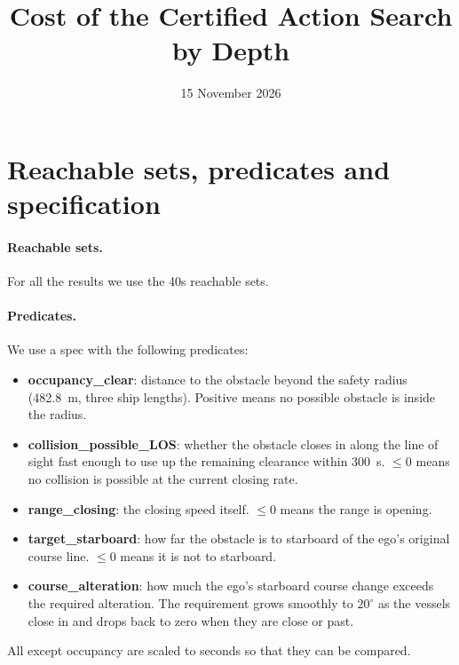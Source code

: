 \documentclass[11pt,a4paper]{article}
\title{Cost of the Certified Action Search by Depth}
\author{} %
\date{15 November 2026}
\begin{document}
\maketitle

\section{Reachable sets, predicates and specification}

\paragraph{Reachable sets.} For all the results we use the 40s reachable sets. 

\paragraph{Predicates.} We use a spec with the following predicates:
\begin{itemize}\itemsep 2pt
  \item \textbf{occupancy\_clear}: distance to the obstacle beyond the safety
    radius (482.8~m, three ship lengths). Positive means no possible obstacle
    is inside the radius.
  \item \textbf{collision\_possible\_LOS}: whether the obstacle closes in
    along the line of sight fast enough to use up the remaining clearance
    within 300~s. $\le 0$ means no collision is possible at the current
    closing rate.
  \item \textbf{range\_closing}: the closing speed itself. $\le 0$ means the
    range is opening.
  \item \textbf{target\_starboard}: how far the obstacle is to starboard of
    the ego's original course line. $\le 0$ means it is not to starboard.
  \item \textbf{course\_alteration}: how much the ego's starboard course
    change exceeds the required alteration. The requirement grows smoothly to
    $20^\circ$ as the vessels close in and drops back to zero when they are
    close or past.
\end{itemize}
All except occupancy are scaled to seconds so that they can be compared.
\end{document}
